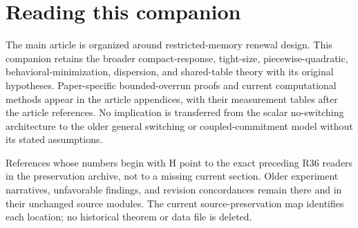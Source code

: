 \section*{Reading this companion}
The main article is organized around restricted-memory renewal design. This companion retains the broader compact-response, tight-size, piecewise-quadratic, behavioral-minimization, dispersion, and shared-table theory with its original hypotheses. Paper-specific bounded-overrun proofs and current computational methods appear in the article appendices, with their measurement tables after the article references. No implication is transferred from the scalar no-switching architecture to the older general switching or coupled-commitment model without its stated assumptions.

References whose numbers begin with H point to the exact preceding R36 readers in the preservation archive, not to a missing current section. Older experiment narratives, unfavorable findings, and revision concordances remain there and in their unchanged source modules. The current source-preservation map identifies each location; no historical theorem or data file is deleted.
